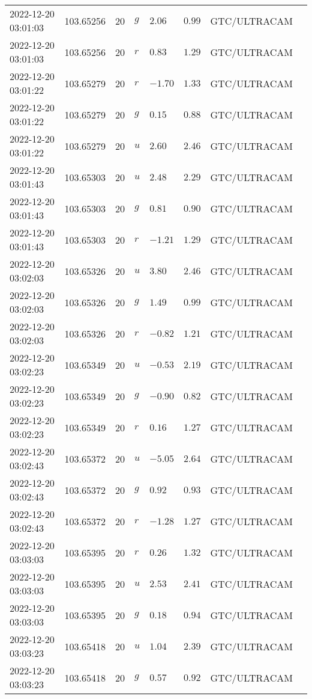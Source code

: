 \documentclass{nature_plusfigure}
\begin{document}
\begin{supplement}
\begin{center}
\begin{longtable}{llllllll}
2022-12-20 03:01:03 & 103.65256 & 20 & $g$ & $2.06$ & $0.99$ & GTC/ULTRACAM &  \\ 
2022-12-20 03:01:03 & 103.65256 & 20 & $r$ & $0.83$ & $1.29$ & GTC/ULTRACAM &  \\ 
2022-12-20 03:01:22 & 103.65279 & 20 & $r$ & $-1.70$ & $1.33$ & GTC/ULTRACAM &  \\ 
2022-12-20 03:01:22 & 103.65279 & 20 & $g$ & $0.15$ & $0.88$ & GTC/ULTRACAM &  \\ 
2022-12-20 03:01:22 & 103.65279 & 20 & $u$ & $2.60$ & $2.46$ & GTC/ULTRACAM &  \\ 
2022-12-20 03:01:43 & 103.65303 & 20 & $u$ & $2.48$ & $2.29$ & GTC/ULTRACAM &  \\ 
2022-12-20 03:01:43 & 103.65303 & 20 & $g$ & $0.81$ & $0.90$ & GTC/ULTRACAM &  \\ 
2022-12-20 03:01:43 & 103.65303 & 20 & $r$ & $-1.21$ & $1.29$ & GTC/ULTRACAM &  \\ 
2022-12-20 03:02:03 & 103.65326 & 20 & $u$ & $3.80$ & $2.46$ & GTC/ULTRACAM &  \\ 
2022-12-20 03:02:03 & 103.65326 & 20 & $g$ & $1.49$ & $0.99$ & GTC/ULTRACAM &  \\ 
2022-12-20 03:02:03 & 103.65326 & 20 & $r$ & $-0.82$ & $1.21$ & GTC/ULTRACAM &  \\ 
2022-12-20 03:02:23 & 103.65349 & 20 & $u$ & $-0.53$ & $2.19$ & GTC/ULTRACAM &  \\ 
2022-12-20 03:02:23 & 103.65349 & 20 & $g$ & $-0.90$ & $0.82$ & GTC/ULTRACAM &  \\ 
2022-12-20 03:02:23 & 103.65349 & 20 & $r$ & $0.16$ & $1.27$ & GTC/ULTRACAM &  \\ 
2022-12-20 03:02:43 & 103.65372 & 20 & $u$ & $-5.05$ & $2.64$ & GTC/ULTRACAM &  \\ 
2022-12-20 03:02:43 & 103.65372 & 20 & $g$ & $0.92$ & $0.93$ & GTC/ULTRACAM &  \\ 
2022-12-20 03:02:43 & 103.65372 & 20 & $r$ & $-1.28$ & $1.27$ & GTC/ULTRACAM &  \\ 
2022-12-20 03:03:03 & 103.65395 & 20 & $r$ & $0.26$ & $1.32$ & GTC/ULTRACAM &  \\ 
2022-12-20 03:03:03 & 103.65395 & 20 & $u$ & $2.53$ & $2.41$ & GTC/ULTRACAM &  \\ 
2022-12-20 03:03:03 & 103.65395 & 20 & $g$ & $0.18$ & $0.94$ & GTC/ULTRACAM &  \\ 
2022-12-20 03:03:23 & 103.65418 & 20 & $u$ & $1.04$ & $2.39$ & GTC/ULTRACAM &  \\ 
2022-12-20 03:03:23 & 103.65418 & 20 & $g$ & $0.57$ & $0.92$ & GTC/ULTRACAM &  \\ 

\end{longtable}
\end{center}
\end{supplement}
\end{document}

